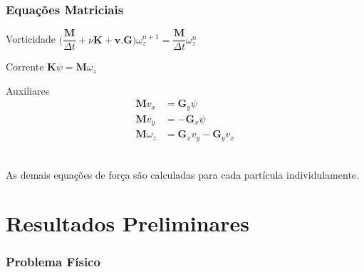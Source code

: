 \documentclass{beamer}
\begin{document}
\begin{frame}
  \frametitle{Equações Matriciais}
  \begin{minipage}{.63\textwidth}
    \centering
    \begin{block}{Vorticidade}
      \centering
      $\bigg(\dfrac{\mathbf{M}}{\Delta t} + \nu \mathbf{K} + \mathbf{v.G} \bigg)\omega_z^{n+1} = \dfrac{\mathbf{M}}{\Delta t} \omega_z^n$
    \end{block}
    
    \begin{block}{Corrente}
      \centering
      $\mathbf{K} \psi = \mathbf{M} \omega_z$
    \end{block}
  \end{minipage}
  \hfill
  \begin{minipage}{.33\textwidth}
    \centering
    \begin{block}{Auxiliares}
      \vspace*{-\baselineskip}\setlength\belowdisplayshortskip{0pt} %
      \centering
      \begin{align*}
	\mathbf{M} v_x &= \mathbf{G}_y \psi \\
	\mathbf{M} v_y &=-\mathbf{G}_x \psi \\
	\mathbf{M} \omega_z &= \mathbf{G}_x v_y - \mathbf{G}_y v_x
      \end{align*}
    \end{block}
  \end{minipage}
  
  \ \\
  As demais equações de força são calculadas para cada partícula individulamente.
\end{frame}

\section{Resultados Preliminares}

\begin{frame}
  \frametitle{Problema Físico}
\end{frame}

\end{document}
